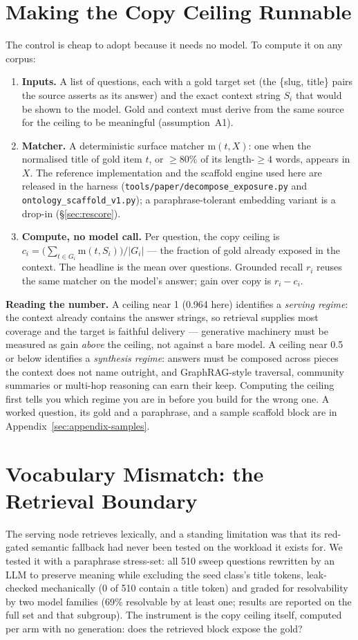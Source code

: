 \documentclass[10pt,twocolumn]{article}
\begin{document}
\section{Making the Copy Ceiling Runnable}\label{sec:runnable}
The control is cheap to adopt because it needs no model. To compute it on any corpus:
\begin{enumerate}[topsep=2pt,itemsep=1pt,leftmargin=1.6em]
\item \textbf{Inputs.} A list of questions, each with a gold target set (the \{slug, title\} pairs the source asserts as its answer) and the exact context string $S_i$ that would be shown to the model. Gold and context must derive from the same source for the ceiling to be meaningful (assumption~A1).
\item \textbf{Matcher.} A deterministic surface matcher $\mathrm{m}(t,X)$: one when the normalised title of gold item $t$, or $\geq80\%$ of its length-$\geq4$ words, appears in $X$. The reference implementation and the scaffold engine used here are released in the harness (\texttt{tools/paper/decompose\_exposure.py} and \texttt{ontology\_scaffold\_v1.py}); a paraphrase-tolerant embedding variant is a drop-in (\S\ref{sec:rescore}).
\item \textbf{Compute, no model call.} Per question, the copy ceiling is $c_i=\bigl(\sum_{t\in G_i}\mathrm{m}(t,S_i)\bigr)/|G_i|$ --- the fraction of gold already exposed in the context. The headline is the mean over questions. Grounded recall $r_i$ reuses the same matcher on the model's answer; gain over copy is $r_i-c_i$.
\end{enumerate}
\textbf{Reading the number.} A ceiling near 1 (0.964 here) identifies a \emph{serving regime}: the context already contains the answer strings, so retrieval supplies most coverage and the target is faithful delivery --- generative machinery must be measured as gain \emph{above} the ceiling, not against a bare model. A ceiling near 0.5 or below identifies a \emph{synthesis regime}: answers must be composed across pieces the context does not name outright, and GraphRAG-style traversal, community summaries or multi-hop reasoning can earn their keep. Computing the ceiling first tells you which regime you are in before you build for the wrong one. A worked question, its gold and a paraphrase, and a sample scaffold block are in Appendix~\ref{sec:appendix-samples}.

\section{Vocabulary Mismatch: the Retrieval Boundary}\label{sec:paraphrase}
The serving node retrieves lexically, and a standing limitation was that its red-gated semantic
fallback had never been tested on the workload it exists for. We tested it with a paraphrase
stress-set: all 510 sweep questions rewritten by an LLM to preserve meaning while excluding the
seed class's title tokens, leak-checked mechanically (0 of 510 contain a title token) and graded
for resolvability by two model families (69\% resolvable by at least one; results are reported
on the full set and that subgroup). The instrument is the copy ceiling itself, computed per arm
with no generation: does the retrieved block expose the gold?
\end{document}
